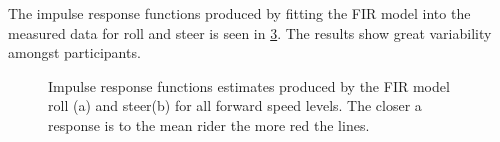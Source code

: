 The impulse response functions produced by fitting the FIR model into the measured data for roll and steer is seen in \cref{fig:IRF_all}. The results show great variability amongst participants.
\begin{figure}
    \centering
    \begin{subfigure}[b]{\textwidth}
        \centering
        \caption{}
        \label{fig:IRF_phi}
    \end{subfigure}
    \begin{subfigure}[b]{\textwidth}
        \centering
        \caption{}            
        \label{fig:IRF_delta}
    \end{subfigure}
    \caption{Impulse response functions estimates produced by the FIR model  roll (a) and steer(b) for all forward speed levels. The closer a response is to the mean rider the more red  the lines.}
    \label{fig:IRF_all}
 \end{figure}
